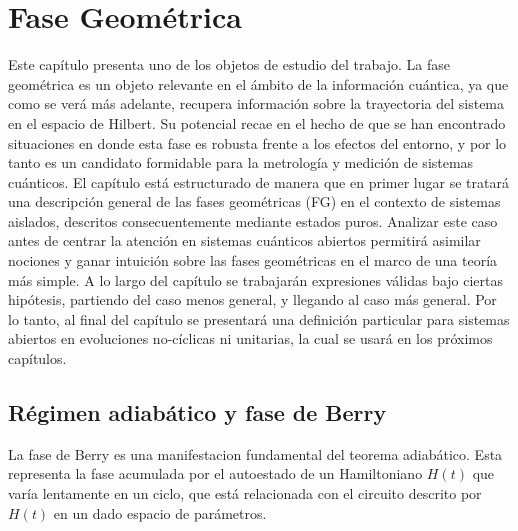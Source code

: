 \chapter{Fase Geométrica}
\label{ch:fg}

\pagestyle{fancy}
\fancyhf{}
\fancyhead[LE]{\nouppercase{\rightmark\hfill}}
\fancyhead[RO]{\nouppercase{\leftmark\hfill}}
\fancyfoot[LE,RO]{\hfill\thepage\hfill}

Este cap\'itulo presenta uno de los objetos de estudio del trabajo. La fase geométrica es un objeto relevante en el ámbito de la informaci\'on cu\'antica, ya que como se ver\'a m\'as adelante, recupera informaci\'on sobre la trayectoria del sistema en el espacio de Hilbert. Su potencial recae en el hecho de que se han encontrado situaciones \cite{Viotti2022} en donde esta fase es robusta frente a los efectos del entorno, y por lo tanto es un candidato formidable para la metrología y medición de sistemas cuánticos.  
El cap\'itulo está estructurado de manera que en primer lugar se tratar\'a una descripción general de las fases geom\'etricas (FG) en el contexto de sistemas aislados, descritos consecuentemente mediante estados puros. Analizar este caso antes de centrar la atención en sistemas cuánticos abiertos permitirá asimilar nociones y ganar intuición sobre las fases geométricas en el marco de una teoría más simple. A lo largo del capítulo se trabajarán expresiones válidas bajo ciertas hipótesis, partiendo del caso menos general, y llegando al caso más general. Por lo tanto, al final del capítulo se presentará una definición particular para sistemas abiertos en evoluciones no-cíclicas ni unitarias, la cual se usará en los próximos capítulos.

\section{R\'egimen adiab\'atico y fase de Berry} \label{sec2:adiabatico}
La fase de Berry \cite{Berry1984} es una manifestacion fundamental del teorema adiab\'atico. Esta representa la fase acumulada por el autoestado de un Hamiltoniano $H(t)$ que var\'ia lentamente en un ciclo, que está relacionada con el circuito descrito por $H(t)$ en un dado espacio de par\'ametros. 

